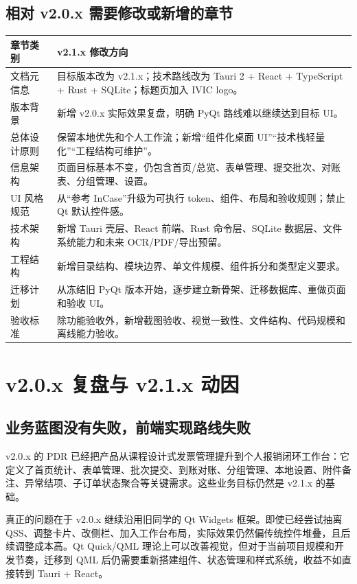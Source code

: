 \documentclass[UTF8,zihao=-4]{ctexart}
\begin{document}
\subsection{相对 v2.0.x 需要修改或新增的章节}

\begin{longtable}{p{3.8cm}p{10.6cm}}
\toprule
章节类别 & v2.1.x 修改方向 \\
\midrule
文档元信息 & 目标版本改为 v2.1.x；技术路线改为 Tauri 2 + React + TypeScript + Rust + SQLite；标题页加入 IVIC logo。 \\
版本背景 & 新增 v2.0.x 实际效果复盘，明确 PyQt 路线难以继续达到目标 UI。 \\
总体设计原则 & 保留本地优先和个人工作流；新增“组件化桌面 UI”“技术栈轻量化”“工程结构可维护”。 \\
信息架构 & 页面目标基本不变，仍包含首页/总览、表单管理、提交批次、对账表、分组管理、设置。 \\
UI 风格规范 & 从“参考 InCase”升级为可执行 token、组件、布局和验收规则；禁止 Qt 默认控件感。 \\
技术架构 & 新增 Tauri 壳层、React 前端、Rust 命令层、SQLite 数据层、文件系统能力和未来 OCR/PDF/导出预留。 \\
工程结构 & 新增目录结构、模块边界、单文件规模、组件拆分和类型定义要求。 \\
迁移计划 & 从冻结旧 PyQt 版本开始，逐步建立新骨架、迁移数据库、重做页面和验收 UI。 \\
验收标准 & 除功能验收外，新增截图验收、视觉一致性、文件结构、代码规模和离线能力验收。 \\
\bottomrule
\end{longtable}

\section{v2.0.x 复盘与 v2.1.x 动因}

\subsection{业务蓝图没有失败，前端实现路线失败}

v2.0.x 的 PDR 已经把产品从课程设计式发票管理提升到个人报销闭环工作台：它定义了首页统计、表单管理、批次提交、到账对账、分组管理、本地设置、附件备注、异常结项、子订单状态聚合等关键需求。这些业务目标仍然是 v2.1.x 的基础。

真正的问题在于 v2.0.x 继续沿用旧同学的 Qt Widgets 框架。即使已经尝试抽离 QSS、调整卡片、改侧栏、加入工作台布局，实际效果仍然偏传统控件堆叠，且后续调整成本高。Qt Quick/QML 理论上可以改善视觉，但对于当前项目规模和开发节奏，迁移到 QML 后仍需要重新搭建组件、状态管理和样式系统，收益不如直接转到 Tauri + React。
\end{document}
